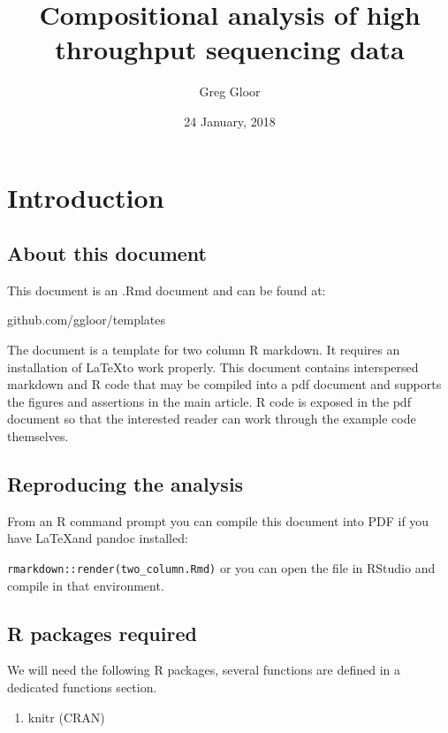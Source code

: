 \documentclass[twocolumn]{article}
\title{Compositional analysis of high throughput sequencing data}
\author{Greg Gloor}
\date{24 January, 2018}
\providecommand{\tightlist}{%
  \setlength{\itemsep}{0pt}\setlength{\parskip}{0pt}}
\begin{document}
\maketitle

{
\hypersetup{linkcolor=black}
\setcounter{tocdepth}{3}
\tableofcontents
}
\clearpage

\section{Introduction}\label{introduction}

\subsection{About this document}\label{about-this-document}

This document is an .Rmd document and can be found at:

github.com/ggloor/templates

The document is a template for two column R markdown. It requires an
installation of \LaTeX to work properly. This document contains
interspersed markdown and R code that may be compiled into a pdf
document and supports the figures and assertions in the main article. R
code is exposed in the pdf document so that the interested reader can
work through the example code themselves.

\subsection{Reproducing the analysis}\label{reproducing-the-analysis}

From an R command prompt you can compile this document into PDF if you
have \LaTeX and pandoc installed:

\texttt{rmarkdown::render(\textquotesingle{}two\_column.Rmd\textquotesingle{})}
or you can open the file in RStudio and compile in that environment.

\subsection{R packages required}\label{r-packages-required}

We will need the following R packages, several functions are defined in
a dedicated functions section.

\begin{enumerate}
\def\labelenumi{\arabic{enumi}.}
\tightlist
\item
  knitr (CRAN)
\end{enumerate}
\end{document}

